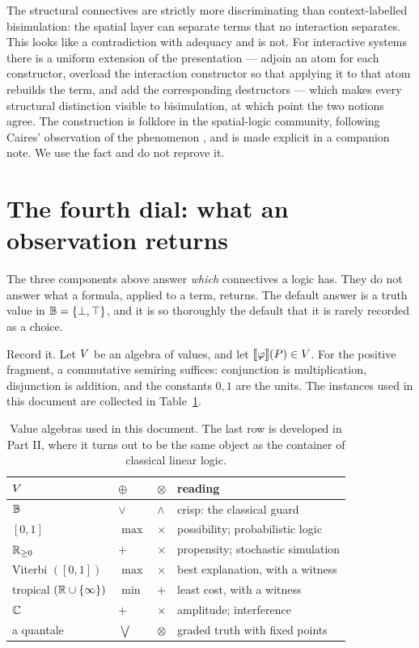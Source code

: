 \begin{remark}
\label{rem:spatialstrict}
The structural connectives are strictly more discriminating than
context-labelled bisimulation: the spatial layer can separate terms that no
interaction separates. This looks like a contradiction with adequacy and is not.
For interactive systems there is a uniform extension of the presentation ---
adjoin an atom for each constructor, overload the interaction constructor so that
applying it to that atom rebuilds the term, and add the corresponding destructors
--- which makes every structural distinction visible to bisimulation, at which
point the two notions agree. The construction is folklore in the spatial-logic
community, following Caires' observation of the phenomenon \cite{Caires04,
CairesCardelli03}, and is made explicit in a companion note. We use the fact and
do not reprove it.
\end{remark}

\section{The fourth dial: what an observation returns}
\label{sec:dialintro}

The three components above answer \emph{which} connectives a logic has. They do
not answer what a formula, applied to a term, returns. The default answer is a
truth value in $\mathbb{B} = \{\bot,\top\}$, and it is so thoroughly the default that it
is rarely recorded as a choice.

Record it. Let $V$ be an algebra of values, and let $\llbracket \varphi \rrbracket(P) \in V$.
For the positive fragment, a commutative semiring suffices: conjunction is
multiplication, disjunction is addition, and the constants $0,1$ are the units.
The instances used in this document are collected in Table~\ref{tab:valuealgebras}.

\begin{table}[h]
\centering
\renewcommand{\arraystretch}{1.25}
\begin{tabular}{@{}llll@{}}
\toprule
$V$ & $\oplus$ & $\otimes$ & reading \\
\midrule
$\mathbb{B}$                & $\vee$ & $\wedge$ & crisp: the classical guard \\
$[0,1]$             & $\max$ & $\times$ & possibility; probabilistic logic \\
$\mathbb{R}_{\ge 0}$        & $+$    & $\times$ & propensity; stochastic simulation \\
Viterbi $([0,1])$   & $\max$ & $\times$ & best explanation, with a witness \\
tropical $(\mathbb{R}\cup\{\infty\})$ & $\min$ & $+$ & least cost, with a witness \\
$\mathbb{C}$               & $+$    & $\times$ & amplitude; interference \\
a quantale          & $\bigvee$ & $\otimes$ & graded truth with fixed points \\
\bottomrule
\end{tabular}
\caption{Value algebras used in this document. The last row is developed in
Part II, where it turns out to be the same object as the container of classical
linear logic.}
\label{tab:valuealgebras}
\end{table}

